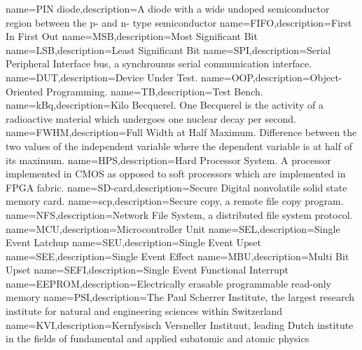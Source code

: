  {name=PIN diode,description={A diode with a wide undoped semiconductor region between the p- and n- type semiconductor}}
 {name=FIFO,description={First In First Out}}
 {name=MSB,description={Most Significant Bit}}
 {name=LSB,description={Least Significant Bit}}
 {name=SPI,description={Serial Peripheral Interface bus, a synchrounus serial communication interface.}}
 {name=DUT,description={Device Under Test.}}
 {name=OOP,description={Object-Oriented Programming.}}
 {name=TB,description={Test Bench.}}
 {name=kBq,description={Kilo Becquerel. One Becquerel is the activity of a radioactive material which undergoes one nuclear decay per second.}}
 {name=FWHM,description={Full Width at Half Maximum. Difference between the two values of the independent variable where the dependent variable is at half of its maximum.}}
 {name=HPS,description={Hard Processor System. A processor implemented in CMOS as opposed to soft processors which are implemented in FPGA fabric.}}
 {name=SD-card,description={Secure Digital nonvolatile solid state memory card.}}
 {name=scp,description={Secure copy, a remote file copy program.}}
 {name=NFS,description={Network File System, a distributed file system protocol.}}
 {name=MCU,description={Microcontroller Unit}}
 {name=SEL,description={Single Event Latchup}}
 {name=SEU,description={Single Event Upset}}
 {name=SEE,description={Single Event Effect}}
 {name=MBU,description={Multi Bit Upset}}
 {name=SEFI,description={Single Event Functional Interrupt}}
 {name=EEPROM,description={Electrically erasable programmable read-only memory}}
 {name=PSI,description={The Paul Scherrer Institute, the largest research institute for natural and engineering sciences within Switzerland}}
 {name=KVI,description={Kernfysisch Versneller Instituut, leading Dutch institute in the fields of fundamental and applied subatomic and atomic physics}}
